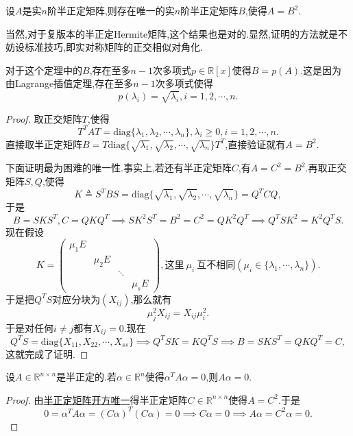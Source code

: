 \documentclass[../../main.tex]{subfiles}
\begin{document}
\begin{theorem}[半正定矩阵开方唯一]\label{theorem:半正定矩阵开方唯一}
设\( A \)是实\( n \)阶半正定矩阵,则存在唯一的实\( n \)阶半正定矩阵\( B \),使得\( A = B^2 \).
\end{theorem}
\begin{note}
当然,对于复版本的半正定Hermite矩阵,这个结果也是对的.显然,证明的方法就是不妨设标准技巧,即实对称矩阵的正交相似对角化.
\end{note}
\begin{remark}
对于这个定理中的\( B \),存在至多\( n - 1 \)次多项式\( p \in \mathbb{R}[x] \)使得\( B = p(A) \).这是因为由Lagrange插值定理,存在至多\( n - 1 \)次多项式使得
\[
p(\lambda_i) = \sqrt{\lambda_i}, i = 1, 2, \cdots, n.
\]
\end{remark}
\begin{proof}
取正交矩阵\( T \),使得
\[
T^T A T = \text{diag}\{\lambda_1, \lambda_2, \cdots, \lambda_n\}, \lambda_i \geqslant  0, i = 1, 2, \cdots, n.
\]
直接取半正定矩阵\( B = T \text{diag}\{\sqrt{\lambda_1}, \sqrt{\lambda_2}, \cdots, \sqrt{\lambda_n}\} T^T \),直接验证就有\( A = B^2 \).

下面证明最为困难的唯一性.事实上,若还有半正定矩阵\( C \),有\( A = C^2 = B^2 \).再取正交矩阵\( S, Q \),使得
\[
K \triangleq S^T B S = \text{diag}\{\sqrt{\lambda_1}, \sqrt{\lambda_2}, \cdots, \sqrt{\lambda_n}\} = Q^T C Q,
\]
于是
\[
B = S K S^T, C = Q K Q^T \implies S K^2 S^T =B^2=C^2= Q K^2 Q^T \implies Q^T S K^2 = K^2 Q^T S.
\]
现在假设
\[
K = \begin{pmatrix}
\mu_1 E \\
& \mu_2 E \\
& & \ddots \\
& & & \mu_s E
\end{pmatrix}, \text{这里}\ \mu_i\ \text{互不相同}(\mu_i\in \{\lambda_1,\cdots,\lambda_n\}).
\]
于是把\( Q^T S \)对应分块为\( (X_{ij}) \),那么就有
\[
\mu_j^2 X_{ij} = X_{ij} \mu_i^2.
\]
于是对任何\( i \neq j \)都有\( X_{ij} = 0 \).现在
\[
Q^T S = \text{diag}\{X_{11}, X_{22}, \cdots, X_{ss}\} \implies Q^T S K = K Q^T S \implies B = S K S^T = Q K Q^T = C,
\]
这就完成了证明.

\end{proof}

\begin{proposition}\label{proposition:半正定矩阵开方唯一推论1}
设\( A \in \mathbb{R}^{n \times n} \)是半正定的.若\( \alpha \in \mathbb{R}^n \)使得\( \alpha^T A \alpha = 0 \),则\( A \alpha = 0 \).
\end{proposition}
\begin{proof}
由\hyperref[theorem:半正定矩阵开方唯一]{半正定矩阵开方唯一}得半正定矩阵\( C \in \mathbb{R}^{n \times n} \)使得\( A = C^2 \).于是
\[
0 = \alpha^T A \alpha = (C \alpha)^T (C \alpha) = 0 \implies C \alpha = 0 \implies A \alpha = C^2 \alpha = 0.
\]

\end{proof}
\end{document}
